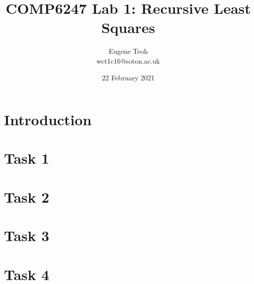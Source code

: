 \documentclass{article}
\title{COMP6247 Lab 1: Recursive Least Squares}
\author{Eugene Teoh\\\bigskip wct1c16@soton.ac.uk}
\date{22 February 2021}
\begin{document}
\maketitle

\section{Introduction}

\section{Task 1}

\section{Task 2}

\section{Task 3}

\section{Task 4}
\end{document}
